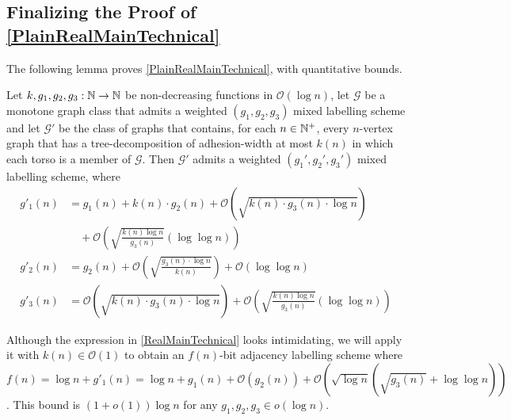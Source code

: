 \documentclass{patmorin}
\newcommand{\vida}[1]{{\color{pink} VD: #1}}
\newcommand{\Oh}{\calO}
\newcommand{\calG}{\mathcal{G}}
\newcommand{\calO}{\mathcal{O}}
\begin{document}

\subsection{Finalizing the Proof of \cref{PlainRealMainTechnical}}


The following lemma proves \cref{PlainRealMainTechnical}, with quantitative bounds. 


\begin{lem}\label{RealMainTechnical}
    Let $k, g_1,g_2,g_3:\mathbb{N}\to\mathbb{N}$ be non-decreasing functions in $\Oh(\log n)$, let $\calG$ be a monotone graph class that admits a weighted $(g_1,g_2,g_3)$ mixed labelling scheme and let $\calG'$ be the class of graphs that contains, for each $n\in\mathbb{N}^+$, every $n$-vertex graph that has a tree-decomposition of adhesion-width at most $k(n)$ in which each torso is a member of $\calG$.  Then $\calG'$ admits a weighted $(g_1',g_2',g_3')$ mixed labelling scheme, where
    \begin{align*}
     g'_1(n) & = g_1(n) + k(n)\cdot g_2(n) + \Oh\left(\sqrt{k(n)\cdot g_3(n)\cdot\log n}\right) \\
     & \quad {} + \Oh\left(\sqrt{\frac{k(n)\log n}{g_3(n)}}(\log\log n)\right)  \\
     g'_2(n) & = g_2(n) + \Oh\left(\sqrt{\frac{g_3(n)\cdot\log n}{k(n)}}\right) + \Oh(\log\log n)  \\
     g'_3(n) & = \Oh\left(\sqrt{k(n)\cdot g_3(n)\cdot\log n}\right) + \Oh\left(\sqrt{\frac{k(n)\log n}{g_3(n)}}(\log\log n)\right)
   \end{align*}
  \end{lem}

  Although the expression in \cref{RealMainTechnical} looks intimidating, we will apply it with $k(n)\in \Oh(1)$ to obtain an $f(n)$-bit adjacency labelling scheme where $f(n)=\log n+ g'_1(n) = \log n + g_1(n) + \Oh(g_2(n)) + \Oh\left(\sqrt{\log n}\left(\sqrt{g_3(n)}+\log\log n\right)\right)$. This bound is $(1+o(1))\log n$ for any $g_1,g_2,g_3\in o(\log n)$.
\end{document}
